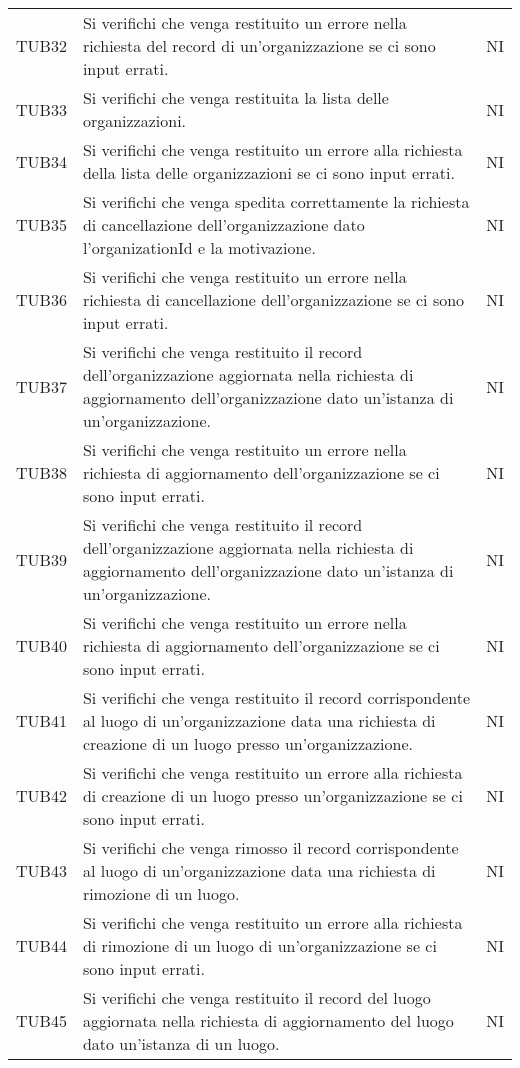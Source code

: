 {\begin{longtable}{ c C{13cm} C{1cm}}
TUB32 & Si verifichi che venga restituito un errore nella richiesta del record di un'organizzazione se ci sono input errati. & NI \\
TUB33 & Si verifichi che venga restituita la lista delle organizzazioni. & NI \\
TUB34 & Si verifichi che venga restituito un errore alla richiesta della lista delle organizzazioni se ci sono input errati. & NI \\
TUB35 & Si verifichi che venga spedita correttamente la richiesta di cancellazione dell'organizzazione dato l'organizationId e la motivazione. & NI \\
TUB36 & Si verifichi che venga restituito un errore nella richiesta di cancellazione dell'organizzazione se ci sono input errati. & NI \\
TUB37 & Si verifichi che venga restituito il record dell'organizzazione aggiornata nella richiesta di aggiornamento dell'organizzazione dato un'istanza di un'organizzazione. & NI \\
TUB38 & Si verifichi che venga restituito un errore nella richiesta di aggiornamento dell'organizzazione se ci sono input errati. & NI \\
TUB39 & Si verifichi che venga restituito il record dell'organizzazione aggiornata nella richiesta di aggiornamento dell'organizzazione dato un'istanza di un'organizzazione. & NI \\
TUB40 & Si verifichi che venga restituito un errore nella richiesta di aggiornamento dell'organizzazione se ci sono input errati. & NI \\
TUB41 & Si verifichi che venga restituito il record corrispondente al luogo di un'organizzazione data una richiesta di creazione di un luogo presso un'organizzazione. & NI \\
TUB42 & Si verifichi che venga restituito un errore alla richiesta di creazione di un luogo presso un'organizzazione se ci sono input errati. & NI \\
TUB43 & Si verifichi che venga rimosso il record corrispondente al luogo di un'organizzazione data una richiesta di rimozione di un luogo. & NI \\
TUB44 & Si verifichi che venga restituito un errore alla richiesta di rimozione di un luogo di un'organizzazione se ci sono input errati. & NI \\
TUB45 & Si verifichi che venga restituito il record del luogo aggiornata nella richiesta di aggiornamento del luogo dato un'istanza di un luogo. & NI \\

\end{longtable}}
